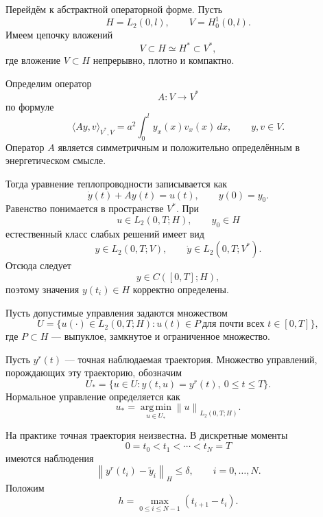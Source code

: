 \documentclass[12pt,a4paper]{article}
\newcommand{\dd}{\,d}
\newcommand{\norm}[1]{\left\lVert #1\right\rVert}
\begin{document}
Перейдём к абстрактной операторной форме. Пусть
\[
    H=L_2(0,l),\qquad V=H_0^1(0,l).
\]
Имеем цепочку вложений
\begin{equation}
    V\subset H\simeq H^*\subset V^*,
\end{equation}
где вложение $V\subset H$ непрерывно, плотно и компактно.

Определим оператор
\[
    A:V\to V^*
\]
по формуле
\begin{equation}
    \langle Ay,v\rangle_{V^*,V}
    =a^2\int_0^l y_x(x)v_x(x)\dd x,
    \qquad y,v\in V.
\end{equation}
Оператор $A$ является симметричным и положительно определённым в энергетическом смысле.

Тогда уравнение теплопроводности записывается как
\begin{equation}
    \dot y(t)+Ay(t)=u(t),\qquad y(0)=y_0.
\end{equation}
Равенство понимается в пространстве $V^*$. При
\[
    u\in L_2(0,T;H),\qquad y_0\in H
\]
естественный класс слабых решений имеет вид
\begin{equation}
    y\in L_2(0,T;V),\qquad \dot y\in L_2(0,T;V^*).
\end{equation}
Отсюда следует
\begin{equation}
    y\in C([0,T];H),
\end{equation}
поэтому значения $y(t_i)\in H$ корректно определены.

Пусть допустимые управления задаются множеством
\begin{equation}
    U=\{u(\cdot)\in L_2(0,T;H): u(t)\in P\ \text{для почти всех }t\in[0,T]\},
\end{equation}
где $P\subset H$ --- выпуклое, замкнутое и ограниченное множество.

Пусть $y^r(t)$ --- точная наблюдаемая траектория. Множество управлений, порождающих эту траекторию, обозначим
\begin{equation}
    U_* = \{u\in U:y(t,u)=y^r(t),\ 0\le t\le T\}.
\end{equation}
Нормальное управление определяется как
\begin{equation}
    u_* = \operatorname*{arg\,min}_{u\in U_*}\norm{u}_{L_2(0,T;H)}.
\end{equation}

На практике точная траектория неизвестна. В дискретные моменты
\[
    0=t_0<t_1<\cdots<t_N=T
\]
имеются наблюдения
\begin{equation}
    \norm{y^r(t_i)-\tilde y_i}_H\le \delta,
    \qquad i=0,\ldots,N.
\end{equation}
Положим
\begin{equation}
    h=\max_{0\le i\le N-1}(t_{i+1}-t_i).
\end{equation}
\end{document}
